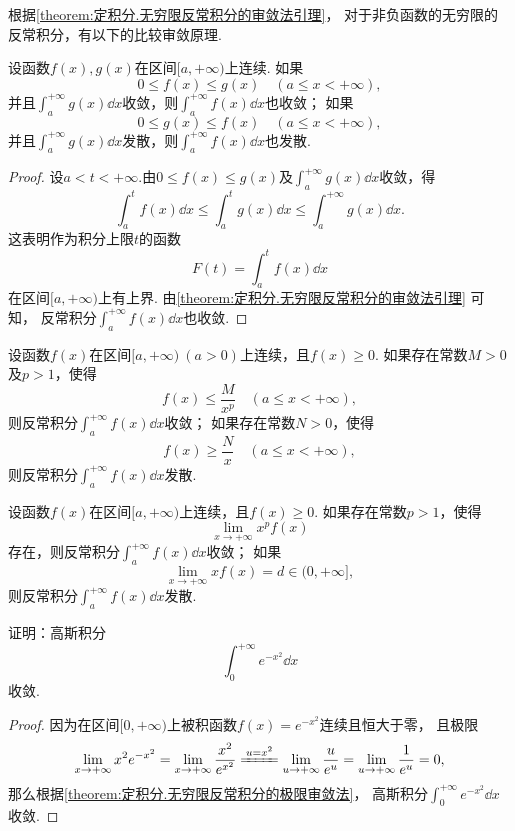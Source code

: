 根据\cref{theorem:定积分.无穷限反常积分的审敛法引理}，
对于非负函数的无穷限的反常积分，有以下的比较审敛原理.
\begin{theorem}[比较审敛原理]\label{theorem:定积分.无穷限反常积分的比较审敛原理}
设函数\(f(x),g(x)\)在区间\([a,+\infty)\)上连续.
如果\[
	0 \leqslant f(x) \leqslant g(x)
	\quad (a \leqslant x < +\infty),
\]并且\(\int_a^{+\infty} g(x) \dd{x}\)收敛，则\(\int_a^{+\infty} f(x) \dd{x}\)也收敛；
如果\[
	0 \leqslant g(x) \leqslant f(x)
	\quad (a \leqslant x < +\infty),
\]
并且\(\int_a^{+\infty} g(x) \dd{x}\)发散，则\(\int_a^{+\infty} f(x) \dd{x}\)也发散.
\begin{proof}
设\(a < t < +\infty\).由\(0 \leqslant f(x) \leqslant g(x)\)及\(\int_a^{+\infty} g(x) \dd{x}\)收敛，得\[
	\int_a^t f(x) \dd{x}
	\leqslant
	\int_a^t g(x) \dd{x}
	\leqslant
	\int_a^{+\infty} g(x) \dd{x}.
\]
这表明作为积分上限\(t\)的函数\[
	F(t) = \int_a^t f(x) \dd{x}
\]
在区间\([a,+\infty)\)上有上界.
由\cref{theorem:定积分.无穷限反常积分的审敛法引理} 可知，
反常积分\(\int_a^{+\infty} f(x) \dd{x}\)也收敛.
\end{proof}
\end{theorem}

\begin{theorem}[比较审敛法]\label{theorem:定积分.无穷限反常积分的比较审敛法}
设函数\(f(x)\)在区间\([a,+\infty)\ (a>0)\)上连续，且\(f(x) \geqslant 0\).
如果存在常数\(M>0\)及\(p>1\)，使得\[
f(x) \leqslant \frac{M}{x^p} \quad (a \leqslant x < +\infty),
\]则反常积分\(\int_a^{+\infty} f(x) \dd{x}\)收敛；
如果存在常数\(N>0\)，使得\[
f(x) \geqslant \frac{N}{x} \quad (a \leqslant x < +\infty),
\]则反常积分\(\int_a^{+\infty} f(x) \dd{x}\)发散.
\end{theorem}

\begin{theorem}[极限审敛法]\label{theorem:定积分.无穷限反常积分的极限审敛法}
设函数\(f(x)\)在区间\([a,+\infty)\)上连续，且\(f(x) \geqslant 0\).
如果存在常数\(p > 1\)，使得\[
\lim\limits_{x \to +\infty} x^p f(x)
\]存在，则反常积分\(\int_a^{+\infty} f(x) \dd{x}\)收敛；
如果\[
\lim\limits_{x \to +\infty} x f(x) = d \in (0,+\infty],
\]则反常积分\(\int_a^{+\infty} f(x) \dd{x}\)发散.
\end{theorem}

\begin{example}\label{example:定积分.高斯积分的收敛性}
证明：高斯积分\[
\int_0^{+\infty} e^{-x^2} \dd{x}
\]收敛.
\begin{proof}
因为在区间\([0,+\infty)\)上被积函数\(f(x) = e^{-x^2}\)连续且恒大于零，%
且极限\[
\lim\limits_{x\to+\infty} x^2 e^{-x^2}
= \lim\limits_{x\to+\infty} \frac{x^2}{e^{x^2}}
\xlongequal{u=x^2} \lim\limits_{u\to+\infty} \frac{u}{e^u}
= \lim\limits_{u\to+\infty} \frac{1}{e^u}
= 0,
\]
那么根据\cref{theorem:定积分.无穷限反常积分的极限审敛法}，%
高斯积分\(\int_0^{+\infty} e^{-x^2} \dd{x}\)收敛.
\end{proof}
\end{example}

